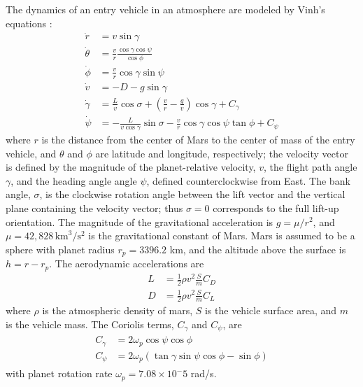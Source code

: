 The dynamics of an entry vehicle in an atmosphere are modeled by Vinh's equations \cite{VinhDyanmics}:
\begin{align}
	\dot{r} &= v\sin\gamma \label{Eq:dynamics:radius:time}\\
	\dot{\theta} &= \frac{v}{r}\frac{\cos\gamma\cos\psi}{\cos\phi} \\
	\dot{\phi} &= \frac{v}{r}\cos\gamma\sin\psi \\
	\dot{v} &= -D - g\sin\gamma \\ 
	\dot{\gamma} &= \frac{L}{v}\cos\sigma + \left(\frac{v}{r}-\frac{g}{v}\right)\cos\gamma + C_{\gamma}\\
	\dot{\psi} &= -\frac{L}{v\cos\gamma}\sin\sigma - \frac{v}{r}\cos\gamma\cos\psi\tan\phi + C_{\psi}
\end{align}
where $r$ is the distance from the center of Mars to the center of mass of the entry vehicle, and $\theta$ and $\phi$ are latitude and longitude, respectively; the velocity vector is defined by the magnitude of the planet-relative velocity, $v$, the flight path angle $\gamma$, and the heading angle angle $\psi$, defined counterclockwise from East. The bank angle, $ \sigma $, is the clockwise rotation angle between the lift vector and the vertical plane containing the velocity vector; thus $\sigma=0$ corresponds to the full lift-up orientation. 
The magnitude of the gravitational acceleration is $g=\mu/r^2$, and $\mu=42,828\, \mathrm{km}^3/\mathrm{s}^2$ is the gravitational constant of Mars. Mars is assumed to be a sphere with planet radius $r_p=3396.2$ km, and the altitude above the surface is $h=r-r_p$. The aerodynamic accelerations are 
\begin{align}
		L &= \frac{1}{2}\rho v^2 \frac{S}{m}C_D \label{Eq:lift_accel}\\
		D &= \frac{1}{2}\rho v^2 \frac{S}{m}C_L \label{Eq:drag_accel}
\end{align}
where $\rho$ is the atmospheric density of mars, $S$ is the vehicle surface area, and $m$ is the vehicle mass.  The Coriolis terms, $ C_{\gamma} $ and $ C_{\psi} $, are
\begin{align}
	\begin{split}
		C_{\gamma} &= 2\omega_p\cos\psi\cos\phi \\
		C_{\psi} &= 2\omega_p(\tan\gamma\sin\psi\cos\phi-\sin\phi)
	\end{split}
\end{align}
with planet rotation rate $\omega_p=7.08\times10^-5$ rad/s. 

